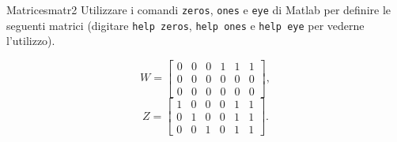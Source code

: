 \begin{qst}{Matrices}{matr2}
    Utilizzare i comandi \verb|zeros|, \verb|ones| e \verb|eye| di Matlab per definire le seguenti matrici
    (digitare \verb|help zeros|, \verb|help ones| e \verb|help eye| per vederne l'utilizzo).

    \[
        W=
        \begin{bmatrix}
            0 & 0 & 0 & 1 & 1 & 1 \\
            0 & 0 & 0 & 0 & 0 & 0 \\
            0 & 0 & 0 & 0 & 0 & 0
        \end{bmatrix},
    \]
    \[
        Z=
        \begin{bmatrix}
            1 & 0 & 0 & 0 & 1 & 1 \\
            0 & 1 & 0 & 0 & 1 & 1 \\
            0 & 0 & 1 & 0 & 1 & 1
        \end{bmatrix}
        .\]
\end{qst}